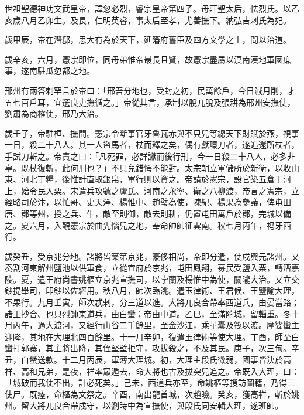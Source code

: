 
\begin{pinyinscope}

 世祖聖德神功文武皇帝，諱忽必烈，睿宗皇帝第四子。母莊聖太后，怯烈氏。以乙亥歲八月乙卯生。及長，仁明英睿，事太后至孝，尤善撫下。納弘吉剌氏為妃。



 歲甲辰，帝在潛邸，思大有為於天下，延籓府舊臣及四方文學之士，問以治道。



 歲辛亥，六月，憲宗即位，同母弟惟帝最長且賢，故憲宗盡屬以漠南漢地軍國庶事，遂南駐瓜忽都之地。



 邢州有兩答剌罕言於帝曰：「邢吾分地也，受封之初，民萬餘戶，今日減月削，才五七百戶耳，宜選良吏撫循之。」帝從其言，承制以脫兀脫及張耕為邢州安撫使，劉肅為商榷使，邢乃大治。



 歲壬子，帝駐桓、撫間。憲宗令斷事官牙魯瓦赤與不只兒等總天下財賦於燕，視事一日，殺二十八人。其一人盜馬者，杖而釋之矣，偶有獻環刀者，遂追還所杖者，手試刀斬之。帝責之曰：「凡死罪，必詳讞而後行刑，今一日殺二十八人，必多非辜。既杖復斬，此何刑也？」不只兒錯愕不能對。太宗朝立軍儲所於新衛，以收山東、河北丁糧，後惟計直取銀帛，軍行則以資之。帝請於憲宗，設官築五倉于河上，始令民入粟。宋遣兵攻虢之盧氏、河南之永寧、衛之八柳渡，帝言之憲宗，立經略司於汴，以忙哥、史天澤、楊惟中、趙璧為使，陳紀、楊果為參議，俾屯田唐、鄧等州，授之兵、牛，敵至則御，敵去則耕，仍置屯田萬戶於鄧，完城以備之。夏六月，入覲憲宗於曲先惱兒之地，奉命帥師征雲南。秋七月丙午，祃牙西行。



 歲癸丑，受京兆分地。諸將皆築第京兆，豪侈相尚，帝即分遣，使戍興元諸州。又奏割河東解州鹽池以供軍食，立從宜府於京兆，屯田鳳翔，募民受鹽入粟，轉漕嘉陵。夏，遣王府尚書姚樞立京兆宣撫司，以孛蘭及楊惟中為使，關隴大治。又立交鈔提舉司，印鈔以佐經用。秋八月，師次臨洮。遣玉律術、王君候、王鑒諭大理，不果行。九月壬寅，師次忒剌，分三道以進。大將兀良合帶率西道兵，由晏當路；諸王抄合、也只烈帥東道兵，由白蠻；帝由中道。乙巳，至滿陀城，留輜重。冬十月丙午，過大渡河，又經行山谷二千餘里，至金沙江，乘革囊及筏以渡。摩娑蠻主迎降，其地在大理北四百餘里。十一月辛卯，復遣玉律術等使大理。丁酉，師至白蠻打郭寨，其主將出降，其侄堅壁拒守，攻拔殺之，不及其民。庚子，次三甸。辛丑，白蠻送款。十二月丙辰，軍薄大理城。初，大理主段氏微弱，國事皆決於高祥、高和兄弟，是夜，祥率眾遁去，命大將也古及拔突兒追之。帝既入大理，曰：「城破而我使不出，計必死矣。」己未，西道兵亦至，命姚樞等搜訪圖籍，乃得三使尸。既瘞，命樞為文祭之。辛酉，南出龍首城，次趙瞼。癸亥，獲高祥，斬於姚州。留大將兀良合帶戍守，以劉時中為宣撫使，與段氏同安輯大理，遂班師。




\end{pinyinscope}
